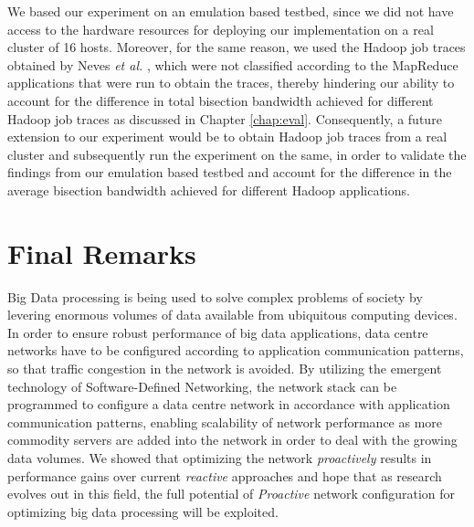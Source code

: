 We based our experiment on an emulation based testbed, since we did not have access to the hardware resources for deploying our implementation on a real cluster of 16 hosts. Moreover, for the same reason, we used the Hadoop job traces obtained by Neves \textit{et al.} \cite{neves2015mremu}, which were not classified according to the MapReduce applications that were run to obtain the traces, thereby hindering our ability to account for the difference in total bisection bandwidth achieved for different Hadoop job traces as discussed in Chapter \ref{chap:eval}. Consequently, a future extension to our experiment would be to obtain Hadoop job traces from a real cluster and subsequently run the experiment on the same, in order to validate the findings from our emulation based testbed and account for the difference in the average bisection bandwidth achieved for different Hadoop applications.   

\section{Final Remarks}

Big Data processing is being used to solve complex problems of society by levering enormous volumes of data available from ubiquitous computing devices. In order to ensure robust performance of big data applications, data centre networks have to be configured according to application communication patterns, so that traffic congestion in the network is avoided. By utilizing the emergent technology of Software-Defined Networking, the network stack can be programmed to configure a data centre network in accordance with application communication patterns, enabling scalability of network performance as more commodity servers are added into the network in order to deal with the growing data volumes. We showed that optimizing the network \textit{proactively} results in performance gains over current \textit{reactive} approaches and hope that as research evolves out in this field, the full potential of \textit{Proactive} network configuration for optimizing big data processing will be exploited.   